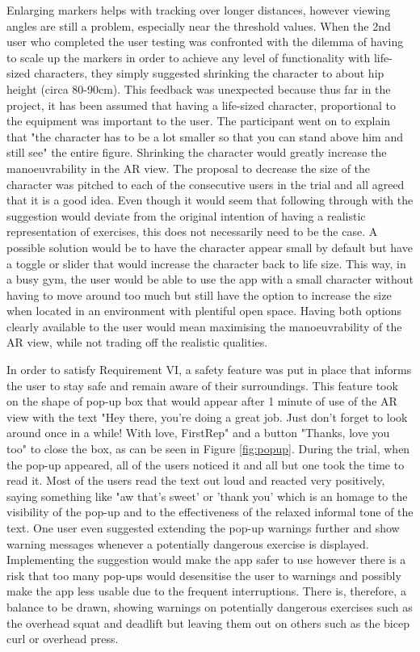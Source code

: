 \documentclass{l4proj}
\begin{document}
Enlarging markers helps with tracking over longer distances, however viewing angles are still a problem, especially near the threshold values. When the 2nd user who completed the user testing was confronted with the dilemma of having to scale up the markers in order to achieve any level of functionality with life-sized characters, they simply suggested shrinking the character to about hip height (circa 80-90cm). This feedback was unexpected because thus far in the project, it has been assumed that having a life-sized character, proportional to the equipment was important to the user. The participant went on to explain that "the character has to be a lot smaller so that you can stand above him and still see" the entire figure. Shrinking the character would greatly increase the manoeuvrability in the AR view. The proposal to decrease the size of the character was pitched to each of the consecutive users in the trial and all agreed that it is a good idea. Even though it would seem that following through with the suggestion would deviate from the original intention of having a realistic representation of exercises, this does not necessarily need to be the case. A possible solution would be to have the character appear small by default but have a toggle or slider that would increase the character back to life size. This way, in a busy gym, the user would be able to use the app with a small character without having to move around too much but still have the option to increase the size when located in an environment with plentiful open space. Having both options clearly available to the user would mean maximising the manoeuvrability of the AR view, while not trading off the realistic qualities. 

In order to satisfy Requirement VI, a safety feature was put in place that informs the user to stay safe and remain aware of their surroundings. This feature took on the shape of pop-up box that would appear after 1 minute of use of the AR view with the text "Hey there, you're doing a great job. Just don't forget to look around once in a while! With love, FirstRep" and a button "Thanks, love you too" to close the box, as can be seen in Figure \ref{fig:popup}. During the trial, when the pop-up appeared, all of the users noticed it and all but one took the time to read it. Most of the users read the text out loud and reacted very positively, saying something like "aw that's sweet' or 'thank you' which is an homage to the visibility of the pop-up and to the effectiveness of the relaxed informal tone of the text. One user even suggested extending the pop-up warnings further and show warning messages whenever a potentially dangerous exercise is displayed. Implementing the suggestion would make the app safer to use however there is a risk that too many pop-ups would desensitise the user to warnings and possibly make the app less usable due to the frequent interruptions. There is, therefore, a balance to be drawn, showing warnings on potentially dangerous exercises such as the overhead squat and deadlift but leaving them out on others such as the bicep curl or overhead press. 
\end{document}
